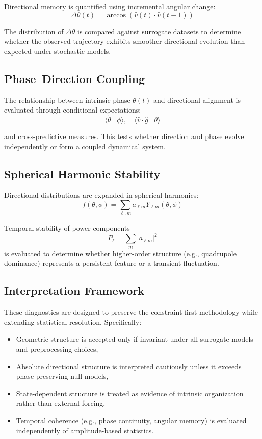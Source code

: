 \documentclass[twocolumn,9pt]{revtex4-2}
\begin{document}
Directional memory is quantified using incremental angular change:
\[
\Delta \theta(t) = \arccos(\hat{v}(t) \cdot \hat{v}(t-1))
\]

The distribution of $\Delta \theta$ is compared against surrogate datasets to determine whether the
observed trajectory exhibits smoother directional evolution than expected under stochastic models.

\subsection{Phase--Direction Coupling}
\label{subsec:phase_direction_coupling}

The relationship between intrinsic phase $\theta(t)$ and directional alignment is evaluated through
conditional expectations:
\[
\langle \dot{\theta} \mid \phi \rangle, \quad \langle \hat{v} \cdot \hat{g} \mid \theta \rangle
\]

and cross-predictive measures. This tests whether direction and phase evolve independently or form
a coupled dynamical system.

\subsection{Spherical Harmonic Stability}
\label{subsec:spherical_harmonic_stability}

Directional distributions are expanded in spherical harmonics:
\[
f(\theta, \phi) = \sum_{\ell,m} a_{\ell m} Y_{\ell m}(\theta, \phi)
\]

Temporal stability of power components
\[
P_\ell = \sum_m |a_{\ell m}|^2
\]
is evaluated to determine whether higher-order structure (e.g., quadrupole dominance) represents a
persistent feature or a transient fluctuation.

\subsection{Interpretation Framework}
\label{subsec:interpretation_framework}

These diagnostics are designed to preserve the
constraint-first methodology while extending statistical
resolution. Specifically:

\begin{itemize}
\item Geometric structure is accepted only if invariant under
all surrogate models and preprocessing choices,
\item Absolute directional structure is interpreted cautiously
unless it exceeds phase-preserving null models,
\item State-dependent structure is treated as evidence of
intrinsic organization rather than external forcing,
\item Temporal coherence (e.g., phase continuity, angular
memory) is evaluated independently of amplitude-based
statistics.
\end{itemize}
\end{document}
